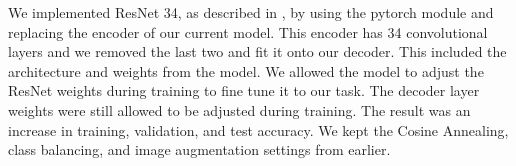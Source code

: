 \documentclass{article}
\begin{document}
We implemented ResNet 34, as described in \cite{he_deep_2015}, by using the pytorch module and replacing the encoder of our current model. This encoder has 34 convolutional layers and we removed the last two and fit it onto our decoder. This included the architecture and weights from the model. We allowed the model to adjust the ResNet weights during training to fine tune it to our task. The decoder layer weights were still allowed to be adjusted during training. The result was an increase in training, validation, and test accuracy. We kept the Cosine Annealing, class balancing, and image augmentation settings from earlier.


\begin{table}[H]
  \centering
  \caption{ResNet Structure}
  \label{tab:baseline}%
\end{table}%
\end{document}
